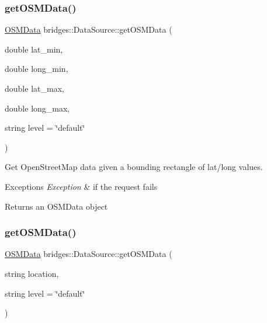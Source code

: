 \subsubsection{\texorpdfstring{getOSMData()}{getOSMData()}\hspace{0.1cm}{\footnotesize\ttfamily [1/2]}}
{\footnotesize\ttfamily \mbox{\hyperlink{classbridges_1_1dataset_1_1_o_s_m_data}{O\+S\+M\+Data}} bridges\+::\+Data\+Source\+::get\+O\+S\+M\+Data (\begin{DoxyParamCaption}\item[{double}]{lat\+\_\+min,  }\item[{double}]{long\+\_\+min,  }\item[{double}]{lat\+\_\+max,  }\item[{double}]{long\+\_\+max,  }\item[{string}]{level = {\ttfamily \char`\"{}default\char`\"{}} }\end{DoxyParamCaption})\hspace{0.3cm}{\ttfamily [inline]}}

Get Open\+Street\+Map data given a bounding rectangle of lat/long values.


\begin{DoxyExceptions}{Exceptions}
{\em Exception} & if the request fails\\
\hline
\end{DoxyExceptions}
\begin{DoxyReturn}{Returns}
an O\+S\+M\+Data object 
\end{DoxyReturn}
\mbox{\label{classbridges_1_1_data_source_a3151f5b2a27b5d6b11e1c5cb55d51655}} 
\subsubsection{\texorpdfstring{getOSMData()}{getOSMData()}\hspace{0.1cm}{\footnotesize\ttfamily [2/2]}}
{\footnotesize\ttfamily \mbox{\hyperlink{classbridges_1_1dataset_1_1_o_s_m_data}{O\+S\+M\+Data}} bridges\+::\+Data\+Source\+::get\+O\+S\+M\+Data (\begin{DoxyParamCaption}\item[{string}]{location,  }\item[{string}]{level = {\ttfamily \char`\"{}default\char`\"{}} }\end{DoxyParamCaption})\hspace{0.3cm}{\ttfamily [inline]}}

